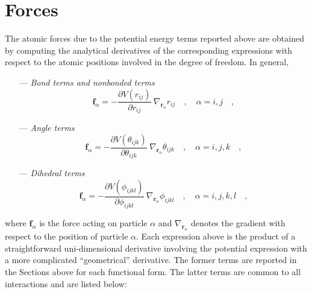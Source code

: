 \documentclass[10pt,a4paper]{report}
\numberwithin{equation}{section}
\begin{document}
\section{Forces}
\label{sec:forces}

The atomic forces due to the potential energy terms reported above are
obtained by computing the analytical derivatives of the corresponding
expressions with respect to the atomic positions involved in the
degree of freedom.  In general,

\begin{itemize}
  \item[---]\textit{Bond terms and nonbonded terms}
\begin{equation}
  \label{eq:bond-forces}
  \mathbf{f}_\alpha = -\frac{\partial V(r_{ij})}{\partial r_{ij}}\ \nabla_{\mathbf{r}_{\alpha}} r_{ij}\quad , \quad \alpha = i,j \quad ,
\end{equation}
  \item[---]\textit{Angle terms}
\begin{equation}
  \label{eq:angle-forces}
  \mathbf{f}_\alpha = -\frac{\partial V(\theta_{ijk})}{\partial \theta_{ijk}}\ \nabla_{\mathbf{r}_{\alpha}} \theta_{ijk}\quad , \quad \alpha = i,j,k \quad ,
\end{equation}
  \item[---]\textit{Dihedral terms}
\begin{equation}
  \label{eq:dihedral-forces}
  \mathbf{f}_\alpha = -\frac{\partial V(\phi_{ijkl})}{\partial \phi_{ijkl}}\ \nabla_{\mathbf{r}_{\alpha}} \phi_{ijkl}\quad , \quad \alpha = i,j,k,l \quad ,
\end{equation}
\end{itemize}
where $\mathbf{f}_\alpha$ is the force acting on particle $\alpha$ and
$\nabla_{\mathbf{r}_\alpha}$ denotes the gradient with respect to the
position of particle $\alpha$. Each expression above is the product of
a straightforward uni-dimensional derivative involving the potential
expression with a more complicated ``geometrical'' derivative. The
former terms are reported in the Sections above for each functional
form. The latter terms are common to all interactions and are listed
below:
\end{document}
